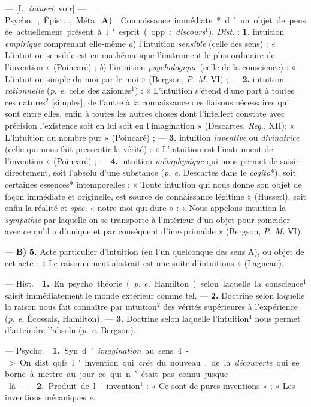 \begin{itemize}[leftmargin=1cm, label=, itemsep=1pt]
 — [L. {\it intueri}, voir] — \si{Psycho.}, \si{Épist.},
\si{Méta.} {\bf A)}  Connaissance immédiate* d’un objet de
pensée actuellement présent à l'esprit (opp. : {\it discours}$^1$).
{\it Dist.} : {\bf 1.} intuition {\it empirique} comprenant elle-même
{\it a}) l'intuition {\it sensible} (celle des sens) : « L'intuition sensible
est en mathématique l'instrument le plus ordinaire de
l'invention » (Poincaré) ; {\it b}) l'intuition {\it psychologique} (celle de
la conscience) : « L’intuition simple du moi par le moi » (Bergson, {\it P.
M.} VI) ; — {\bf 2.} intuition {\it rationnelle} ({\it p. e.} celle des
axiomes$^1$) : « L’intuition s'étend d'une part à toutes ces natures$^2$
[simples], de l’autre à la connaissance des liaisons nécessaires qui sont
entre elles, enfin à toutes les autres choses dont l’intellect constate avec
précision l'existence soit en lui soit en l'imagination » (Descartes,
{\it Reg.}, XII); « L’intuition du nombre pur » (Poincaré) ; —  {\bf 3.}
intuition {\it inventive} ou {\it divinatrice} (celle qui nous fait
pressentir la vérité) : « L’intuition est l’instrument de
l'invention » (Poincaré) ; —  {\bf 4.} intuition {\it métaphysique} qui nous
permet de saisir directement, soit l'absolu d’une substance ({\it p. e.}
Descartes dans le {\it cogito}*), soit certaines essences* intemporelles :
« Toute intuition qui nous donne son objet
de façon immédiate et originelle, est source de connaissance légitime »
(Husserl), soit enfin la réalité et {\it spéc.} « notre moi qui dure » :
« Nous appelons intuition la {\it sympathie} par laquelle on se transporte à
l’intérieur d’un objet pour coïncider avec ce qu'il a d’unique et par
conséquent d’inexprimable » (Bergson, {\it P. M.} VI).

— {\bf B)}  {\bf 5.} Acte particulier d’intuition (en l’un
quelconque des sens A), ou objet de cet acte : « Le raisonnement abstrait est
une suite d’intuitions » (Lagneau).

 — \si{Hist.}  {\bf 1.} En psycho. théorie
({\it p. e.} Hamilton) selon laquelle la conscience$^1$ saisit immédiatement
le monde extérieur comme tel. —  {\bf 2.} Doctrine selon laquelle la raison
nous fait connaître par intuition$^2$ des vérités supérieures à l’expérience
({\it p. e.} Écossais, Hamilton). —  {\bf 3.} Doctrine selon laquelle
l'intuition$^4$ nous permet d'atteindre l'absolu ({\it p. e.} Bergson).

 — \si{Psycho.}  {\bf 1.} Syn.
d'{\it imagination} au sens 4. -> On dist. qqfs. l'invention qui
{\it crée} du nouveau, de la {\it découverte} qui se borne à mettre au jour
ce qui n’était pas connu jusque-là. —  {\bf 2.} Produit de
l'invention$^1$ : « Ce sont de pures inventions » ; « Les inventions
mécaniques ».


\end{itemize}
